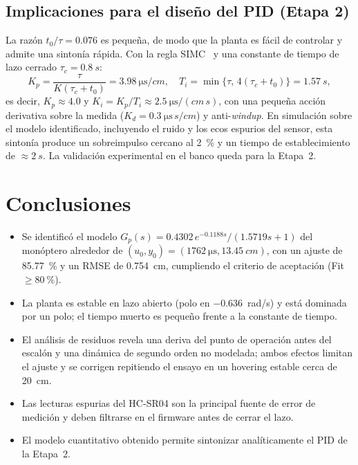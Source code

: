 \documentclass[conference,10pt]{IEEEtran}
\begin{document}
\subsection{Implicaciones para el diseño del PID (Etapa 2)}
La razón $t_0/\tau=0.076$ es pequeña, de modo que la planta es fácil de controlar y admite una sintonía rápida. Con la regla SIMC~\cite{skogestad} y una constante de tiempo de lazo cerrado $\tau_c=\SI{0.8}{s}$:
\begin{equation}
K_p=\frac{\tau}{K(\tau_c+t_0)}=\SI{3.98}{\micro\second/cm},\quad
T_i=\min\{\tau,\,4(\tau_c+t_0)\}=\SI{1.57}{s},
\end{equation}
es decir, $K_p\approx 4.0$ y $K_i=K_p/T_i\approx\SI{2.5}{\micro\second/(cm\,s)}$, con una pequeña acción derivativa sobre la medida ($K_d=\SI{0.3}{\micro\second\,s/cm}$) y anti-\textit{windup}. En simulación sobre el modelo identificado, incluyendo el ruido y los ecos espurios del sensor, esta sintonía produce un sobreimpulso cercano al \SI{2}{\percent} y un tiempo de establecimiento de $\approx\SI{2}{s}$. La validación experimental en el banco queda para la Etapa~2.

\section{Conclusiones}
\begin{itemize}
\item Se identificó el modelo $G_p(s)=0.4302\,e^{-0.1188s}/(1.5719s+1)$ del monóptero alrededor de $(u_0,y_0)=(\SI{1762}{\micro\second},\SI{13.45}{cm})$, con un ajuste de \SI{85.77}{\percent} y un RMSE de \SI{0.754}{cm}, cumpliendo el criterio de aceptación (Fit $\geq\SI{80}{\percent}$).
\item La planta es estable en lazo abierto (polo en \SI{-0.636}{rad/s}) y está dominada por un polo; el tiempo muerto es pequeño frente a la constante de tiempo.
\item El análisis de residuos revela una deriva del punto de operación antes del escalón y una dinámica de segundo orden no modelada; ambos efectos limitan el ajuste y se corrigen repitiendo el ensayo en un hovering estable cerca de \SI{20}{cm}.
\item Las lecturas espurias del HC-SR04 son la principal fuente de error de medición y deben filtrarse en el firmware antes de cerrar el lazo.
\item El modelo cuantitativo obtenido permite sintonizar analíticamente el PID de la Etapa~2.
\end{itemize}
\end{document}
